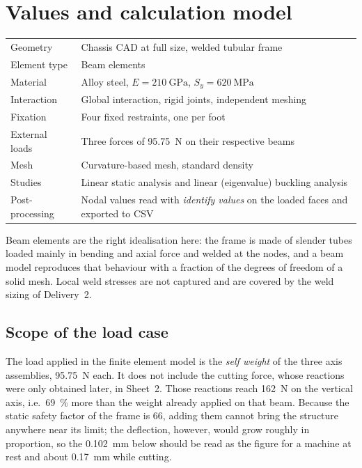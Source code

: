 \documentclass[11pt]{article}
\begin{document}
\section{Values and calculation model}\label{sec:fea-model}

\begin{center}
\begin{tabular}{@{}l>{\raggedright\arraybackslash}p{10.6cm}@{}}
\toprule
Geometry          & Chassis CAD at full size, welded tubular frame \\
Element type      & Beam elements \\
Material          & Alloy steel, $E=\SI{210}{\giga\pascal}$, $S_y=\SI{620}{\mega\pascal}$ \\
Interaction       & Global interaction, rigid joints, independent meshing \\
Fixation          & Four fixed restraints, one per foot \\
External loads    & Three forces of \SI{95.75}{\newton} on their respective beams \\
Mesh              & Curvature-based mesh, standard density \\
Studies           & Linear static analysis and linear (eigenvalue) buckling analysis \\
Post-processing   & Nodal values read with \emph{identify values} on the loaded faces and
                    exported to CSV \\
\bottomrule
\end{tabular}
\end{center}

Beam elements are the right idealisation here: the frame is made of slender tubes loaded
mainly in bending and axial force and welded at the nodes, and a beam model reproduces
that behaviour with a fraction of the degrees of freedom of a solid mesh. Local weld
stresses are not captured and are covered by the weld sizing of Delivery~2.

\subsection{Scope of the load case}

The load applied in the finite element model is the \emph{self weight} of the three axis
assemblies, \SI{95.75}{\newton} each. It does not include the cutting force, whose
reactions were only obtained later, in Sheet~2. Those reactions reach
\SI{162}{\newton} on the vertical axis, i.e.\ \SI{69}{\percent} more than the weight
already applied on that beam. Because the static safety factor of the frame is 66, adding
them cannot bring the structure anywhere near its limit; the deflection, however, would
grow roughly in proportion, so the \SI{0.102}{\milli\metre} below should be read as the
figure for a machine at rest and about \SI{0.17}{\milli\metre} while cutting.
\end{document}

